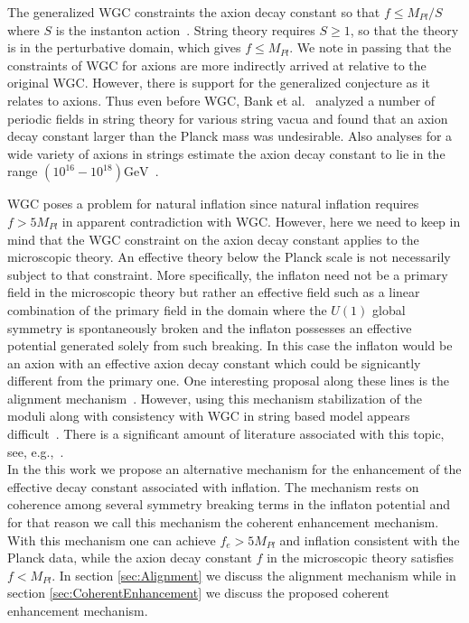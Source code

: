\documentclass[12pt]{article}
\begin{document}
The generalized WGC constraints the axion decay constant so that $f \leq M_{Pl} / S$ where $S$ is the instanton action~\cite{Brown:2015iha, Brown:2015lia, Heidenreich:2015wga}.
String theory requires $S \geq 1$, so that the theory is in the perturbative domain, which gives $f \leq M_{Pl}$.
We note in passing that the constraints of WGC for axions are more indirectly arrived at relative to the original WGC.
However, there is support for the generalized conjecture as it relates to axions.
Thus even before WGC, Bank et al.~\cite{Banks:2003sx} analyzed a number of periodic fields in string theory for various string vacua and found that an axion decay constant larger than the Planck mass was undesirable.
Also analyses for a wide variety of axions in strings estimate the axion decay constant to lie in the range $\left(10^{16} - 10^{18}\right) \text{GeV}$~\cite{Svrcek:2006yi}.

WGC poses a problem for natural inflation since natural inflation requires $f > 5 M_{Pl}$ in apparent contradiction with WGC.
However, here we need to keep in mind that the WGC constraint on the axion decay constant applies to the microscopic theory.
An effective theory below the Planck scale is not necessarily subject to that constraint.
More specifically, the inflaton need not be a primary field in the microscopic theory but rather an effective field such as a linear combination of the primary field in the domain where the $U\left(1\right)$ global symmetry is spontaneously broken and the inflaton possesses an effective potential generated solely from such breaking.
In this case the inflaton would be an axion with an effective axion decay constant which could be signicantly different from the primary one.
One interesting proposal along these lines is the alignment mechanism~\cite{Kim:2004rp}.
However, using this mechanism stabilization of the moduli along with consistency with WGC in string based model appears difficult~\cite{Long:2014dta}.
There is a significant amount of literature associated with this topic, see, e.g.,~\cite{Rudelius:2015xta, Rudelius:2014wla, Bachlechner:2014gfa, Choi:2014rja, delaFuente:2014aca, Blumenhagen:2014gta, Hebecker:2015rya, Conlon:2016aea, Montero:2015ofa, Junghans:2015hba}.\\

In the this work we propose an alternative mechanism for the enhancement of the effective decay constant associated with inflation.
The mechanism rests on coherence among several symmetry breaking terms in the inflaton potential and for that reason we call this mechanism the coherent enhancement mechanism.
With this mechanism one can achieve $f_e > 5 M_{Pl}$ and inflation consistent with the Planck data, while the axion decay constant $f$ in the microscopic theory satisfies $f < M_{Pl}$.
In section \ref{sec:Alignment} we discuss the alignment mechanism while in section \ref{sec:CoherentEnhancement} we discuss the proposed coherent enhancement mechanism.
\end{document}
